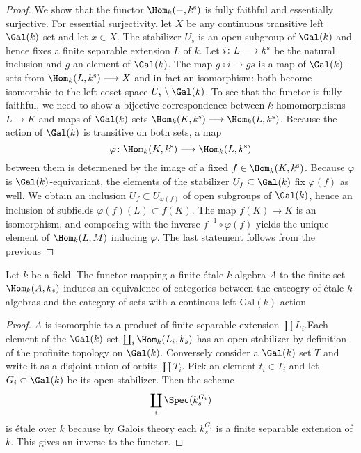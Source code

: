 \begin{proof}
	We show that the functor $\Hom_k(-,k^\sep)$ is fully faithful and essentially surjective. For essential surjectivity, let $X$ be any continuous transitive left $\Gal(k)$-set and let $x \in X$. The stabilizer $U_s$ is an open subgroup of $\Gal(k)$ and hence fixes a finite separable extension $L$ of $k$. Let $i \colon L \longrightarrow k^{\text{s}}$ be the natural inclusion and $g$ an element of $\Gal(k)$. The map $g \circ i \to gs$ is a map of $\Gal(k)$-sets from $\Hom_k(L,k^\sep) \to X$ and in fact an isomorphism: both become isomorphic to the left coset space $U_s\setminus \Gal(k)$.
	To see that the functor is fully faithful, we need to show a bijective correspondence between $k$-homomorphisms $L \to K$ and maps of $\Gal(k)$-sets $\Hom_k(K, k^\sep) \to \Hom_k(L, k^\sep)$. Because the action of $\Gal(k)$ is transitive on both sets, a map
	\[
		\varphi \colon \Hom_k(K, k^\sep) \to \Hom_k(L, k^\sep)
	\]
	between them is determened by the image of a fixed $f \in \Hom_k(K, k^\sep)$. Because $\varphi$ is $\Gal(k)$-equivariant, the elements of the stabilizer $U_f \subseteq \Gal(k)$ fix $\varphi(f)$ as well. We obtain an inclusion $U_f \subset U_{\varphi(f)}$ of open subgroups of $\Gal(k)$, hence an inclusion of subfields $\varphi(f)(L) \subset f(K)$. The map $f(K) \to K$ is an isomorphism, and composing with the inverse $f^{-1} \circ \varphi(f)$ yields the unique element of $\Hom_k(L,M)$ inducing $\varphi$. The last statement follows from the previous
\end{proof}

\begin{theorem}\label{theorem:galois}
	Let $k$ be a field. The functor mapping a finite \'etale $k$-algebra $A$ to the finite set $\Hom_k(A, k_s)$ induces an equivalence of categories between the cateogry of \'etale $k$-algebras and the category of sets with a continous left $\text{Gal}(k)$-action
\end{theorem}

\begin{proof}
	$A$ is isomorphic to a product of finite separable extension $\prod L_i$.Each element of the $\Gal(k)$-set $\coprod_i \Hom_k(L_i, k_s)$ has an open stabilizer by definition of the profinite topology on $\Gal(k)$. Conversely consider a $\Gal(k)$ set $T$ and write it as a disjoint union of orbits $\coprod T_i$. Pick an element $t_i \in T_i$ and let $G_i \subset \Gal(k)$ be its open stabilizer. Then the scheme
	\[
		\coprod_i \Spec(k_s^{G_i})
	\]
	is \'etale over $k$ because by Galois theory each $k_s^{G_i}$ is a finite separable extension of $k$. This gives an inverse to the functor.
\end{proof}\\

